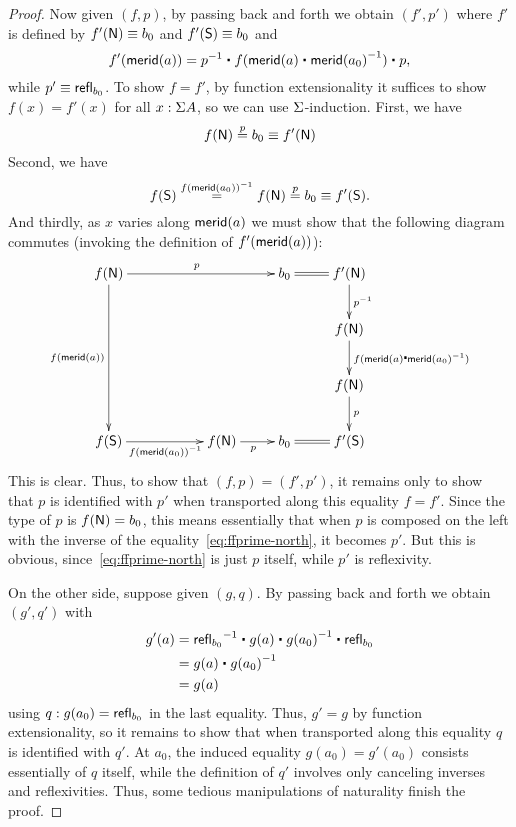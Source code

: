 \begin{proof}
  Now given $(f,p)$, by passing back and forth we obtain $(f',p')$ where $f'$ is defined by $f'(\mathsf{N})\equiv b_0$ and $f'(\mathsf{S})\equiv b_0$ and
  \[ \ap {f'} {\merid(a)} = \opp p \ct \ap f{\merid(a) \ct \opp{\merid(a_0)}} \ct p, \]
  while $p' \equiv \mathsf{refl}_{b_0}$.
  To show $f=f'$, by function extensionality it suffices to show $f(x)=f'(x)$ for all $x:\Sigma A$, so we can use $\Sigma$-induction.
  First, we have
  \begin{equation}
    f(\north) \overset{p}{=} b_0 \jdeq f'(\north)\label{eq:ffprime-north}
  \end{equation}
  Second, we have
  \[f(\mathsf{S}) \overset{\mathord{{{f}({\mathsf{merid}(a_0)})}^{-1}}}{=} f(\mathsf{N}) \overset{p}{=} b_0 \equiv f'(\mathsf{S}).\]
  And thirdly, as $x$ varies along $\mathsf{merid}(a)$ we must show that the following diagram commutes (invoking the definition of ${f'}({\mathsf{merid}(a)})$):
  \[ \xymatrix{
    f(\north) \ar[rrr]^{p} \ar[ddd]_{f(\merid(a))} &&&
    b_0 \ar@{=}[r] &
    f'(\north) \ar[d]^{\opp p}\\
    &&&& f(\north) \ar[d]^{\ap f{\merid(a) \ct \opp{\merid(a_0)}}}\\
    &&&& f(\north) \ar[d]^p\\
    f(\south) \ar[rr]_{\opp{\ap f {\merid(a_0)}}} &&
    f(\north) \ar[r]_p &
    b_0 \ar@{=}[r] &
    f'(\south) }
  \]
  This is clear.
  Thus, to show that $(f,p)=(f',p')$, it remains only to show that $p$ is identified with $p'$ when transported along this equality $f=f'$.
  Since the type of $p$ is $f(\mathsf{N})=b_0$, this means essentially that when $p$ is composed on the left with the inverse of the equality~\eqref{eq:ffprime-north}, it becomes $p'$.
  But this is obvious, since~\eqref{eq:ffprime-north} is just $p$ itself, while $p'$ is reflexivity.

  On the other side, suppose given $(g,q)$.
  By passing back and forth we obtain $(g',q')$ with
  \begin{align*}
    g'(a) &= \opp{\refl{b_0}} \ct g(a) \ct \opp{g(a_0)} \ct \refl{b_0}\\
    &= g(a) \ct \opp{g(a_0)}\\
    &= g(a)
  \end{align*}
  using $q:g(a_0) = \mathsf{refl}_{b_0}$ in the last equality.
  Thus, $g'=g$ by function extensionality, so it remains to show that when transported along this equality $q$ is identified with $q'$.
  At $a_0$, the induced equality $g(a_0)=g'(a_0)$ consists essentially of $q$ itself, while the definition of $q'$ involves only canceling inverses and reflexivities.
  Thus, some tedious manipulations of naturality finish the proof.
\end{proof}

